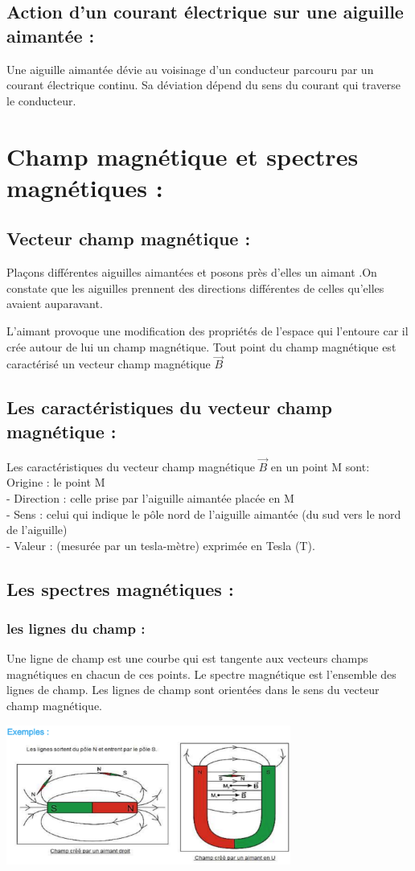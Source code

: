 \documentclass[12pt]{article}
\begin{document}
  \subsection{Action d’un courant électrique sur une aiguille aimantée :}
  Une aiguille aimantée dévie au voisinage d’un conducteur
parcouru par un courant électrique continu. Sa déviation
dépend du sens du courant qui traverse le conducteur.
    \section{Champ magnétique et spectres magnétiques :}
  \subsection{Vecteur champ magnétique : }
Plaçons différentes aiguilles aimantées et posons près d’elles un aimant .On constate que les aiguilles prennent des
directions différentes de celles qu’elles avaient auparavant.

L’aimant provoque une modification des propriétés de l’espace qui l’entoure car il crée autour de lui un champ
magnétique. Tout point du champ magnétique est caractérisé un vecteur champ magnétique $\vec{B}$
\subsection{Les caractéristiques du vecteur champ magnétique :}
Les caractéristiques du vecteur champ magnétique $\vec{B}$ en un point M sont:
\\Origine : le point M
\\- Direction : celle prise par l’aiguille aimantée placée en M
\\- Sens : celui qui indique le pôle nord de l’aiguille aimantée (du sud vers le nord de
l’aiguille)
\\- Valeur : (mesurée par un tesla-mètre) exprimée en Tesla (T).
\subsection{Les spectres magnétiques :}
\subsubsection{les lignes du champ :}
Une ligne de champ est une courbe qui est tangente aux vecteurs champs
magnétiques en chacun de ces points.
Le spectre magnétique est l’ensemble des lignes de champ.
Les lignes de champ sont orientées dans le sens du vecteur champ magnétique.
\begin{center}
    \includegraphics[width=0.7\textwidth]{./img/spectreMag_B.png}
\end{center}
\end{document}
